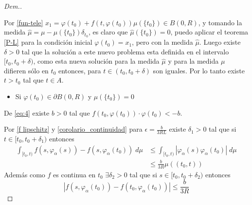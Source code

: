 \begin{proof}[Dem.]
\begin{itemize}
    \end{itemize}
Por \eqref{fun-tele} $x_1=\varphi(t_0)+f(t,\varphi(t_0))\mu(\{t_0\})\in B(0,R)$, y tomando la medida $\hat{\mu}=\mu-\mu(\{t_0\})\delta_{t_0}$, es claro que $\hat{\mu}(\{t_0\})=0$, puedo aplicar el teorema \ref{P-L} para la condición inicial $\varphi(t_0)=x_1$, pero con la medida $\hat{\mu}$. Luego existe $\delta>0$ tal que la solución a este nuevo problema esta definida en el intervalo $[t_0,t_0+\delta)$, como esta nueva solución para la medida $\hat{\mu}$ y para la medida $\mu$ difieren sólo en $t_0$ entonces, para $t\in (t_0,t_0+\delta)$ son iguales. Por lo tanto existe $t>t_0$ tal que $t\in A$.
 		



    
\begin{itemize}
\item Si $\varphi(t_0)\in \partial B(0,R)$ y $\mu(\{t_0\})= 0$ 
\end{itemize}
De \ref{eq:4} existe $b>0$ tal que $f(t_0,\varphi(t_0))\cdot\varphi(t_0)<-b$.

Por \ref{f lipschitz} y \ref{corolario_continuidad} para $\epsilon=\frac{b}{3RL}$ existe $\delta_1>0$ tal que si $t\in[t_0,t_0+\delta_1)$ entonces
\begin{equation}
    \begin{split}
        \int_{[t_0,t)} f(s,\varphi_\alpha(s))-f(s,\varphi_\alpha(t_0))\; d\mu& \leq \int_{[t_0,t)} |\varphi_\alpha(s)\varphi_\alpha(t_0)|\; d\mu \\ &\leq \frac{b}{3R}\mu((t_0,t))
    \end{split}\label{eq:A}
\end{equation}
Además como $f$ es continua en $t_0$ $\exists \delta_2>0 $ tal que si $s\in [t_0,t_0+\delta_2)$ entonces
\begin{equation}
    |f(s,\varphi_\alpha(t_0))-f(t_0,\varphi_\alpha(t_0))|\leq \frac{b}{3R}\label{eq:B}
\end{equation}


\end{proof}
